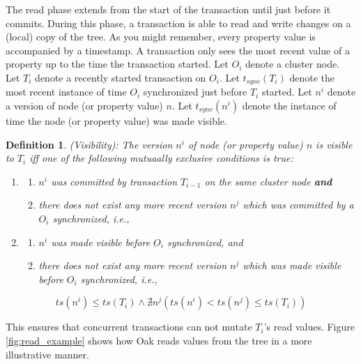 \documentclass[abstracton,12pt]{scrreprt}
\newtheorem{definition}{Definition}
\begin{document}
The read phase extends from the start of the transaction until just before it commits.
During this phase, a transaction is able to read and write changes on a (local) copy of the tree.
As you might remember, every property value is accompanied by a timestamp.
A transaction only sees the most recent value of a property up to the time the transaction started.
Let $O_i$ denote a cluster node.
Let $T_i$ denote a recently started transaction on $O_i$.
Let $t_{sync}(T_i)$ denote the most recent instance of time $O_i$ synchronized just before $T_i$ started.
Let $n^i$ denote a version of node (or property value) $n$.
Let $t_{sync}(n^i)$ denote the instance of time the node (or property value) was made visible.
\begin{definition}
    (Visibility): The version $n^i$ of node (or property value) $n$ is visible to $T_i$ iff one of the following mutuaally exclusive conditions is true:
    \begin{enumerate}
        \item 
            \begin{enumerate}
                \item $n^i$ was committed by transaction $T_{i-1}$ on the same cluster node \textbf{and}
                \item there does not exist any more recent version $n^j$ which was committed by a $O_i$ synchronized, i.e.,    
            \end{enumerate}
        \item
            \begin{enumerate}
                \item $n^i$ was made visible before $O_i$ synchronized, and
                \item there does not exist any more recent version  $n^j$ which was made visible before $O_i$ synchronized, i.e.,    
            \end{enumerate}
        
    \end{enumerate}
$$
ts(n^i) \leq ts(T_i) \land \nexists n^j(ts(n^i) < ts(n^j) \leq ts(T_i))
$$
\end{definition}

This ensures that concurrent transactions can not mutate $T_i$'s read values.
Figure \ref{fig:read_example} shows how Oak reads values from the tree in a more illustrative manner.
\end{document}

